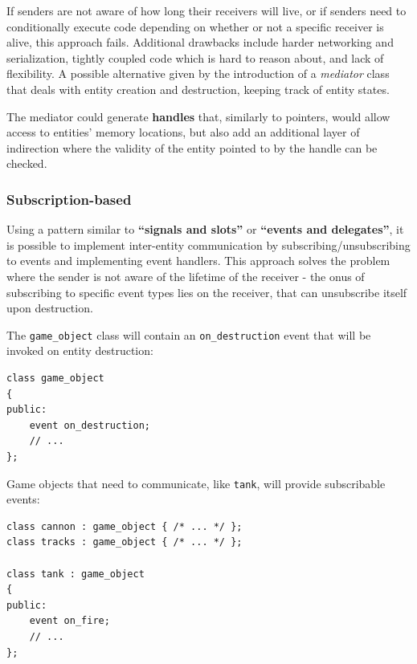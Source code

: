 \documentclass[twoside, 12pt, a4paper, openany]{book}
\begin{document}
If senders are not aware of how long their receivers will live, or if
senders need to conditionally execute code depending on whether or not a
specific receiver is alive, this approach fails. Additional drawbacks
include harder networking and serialization, tightly coupled code which
is hard to reason about, and lack of flexibility. A possible alternative
given by the introduction of a \emph{mediator} class that deals with
entity creation and destruction, keeping track of entity states.

The mediator could generate \textbf{handles} that, similarly to
pointers, would allow access to entities' memory locations, but also add
an additional layer of indirection where the validity of the entity
pointed to by the handle can be checked.

\subsubsection{Subscription-based}\label{subscription-based}

Using a pattern similar to \textbf{``signals and slots''} or
\textbf{``events and delegates''}, it is possible to implement
inter-entity communication by subscribing/unsubscribing to events and
implementing event handlers. This approach solves the problem where the
sender is not aware of the lifetime of the receiver - the onus of
subscribing to specific event types lies on the receiver, that can
unsubscribe itself upon destruction.

The
\texttt{game_object}
class will contain an
\texttt{on_destruction}
event that will be invoked on entity destruction:

\begin{verbatim}
class game_object
{
public:
    event on_destruction;
    // ...
};
\end{verbatim}

Game objects that need to communicate, like
\texttt{tank},
will provide subscribable events:

\begin{verbatim}
class cannon : game_object { /* ... */ };
class tracks : game_object { /* ... */ };

class tank : game_object
{
public:
    event on_fire;
    // ...
};
\end{verbatim}
\end{document}
